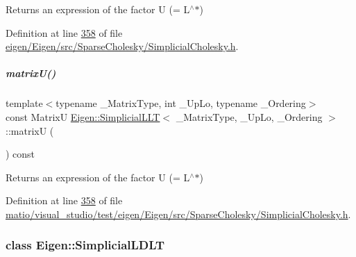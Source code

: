 \begin{DoxyReturn}{Returns}
an expression of the factor U (= L$^\wedge$$\ast$) 
\end{DoxyReturn}


Definition at line \hyperlink{eigen_2_eigen_2src_2_sparse_cholesky_2_simplicial_cholesky_8h_source_l00358}{358} of file \hyperlink{eigen_2_eigen_2src_2_sparse_cholesky_2_simplicial_cholesky_8h_source}{eigen/\+Eigen/src/\+Sparse\+Cholesky/\+Simplicial\+Cholesky.\+h}.

\mbox{\label{group___sparse_cholesky___module_a23522d6444c344ddb14e48dbfac128ed}} 
\subparagraph{\texorpdfstring{matrix\+U()}{matrixU()}\hspace{0.1cm}{\footnotesize\ttfamily [2/2]}}
{\footnotesize\ttfamily template$<$typename \+\_\+\+Matrix\+Type, int \+\_\+\+Up\+Lo, typename \+\_\+\+Ordering$>$ \\
const MatrixU \hyperlink{group___sparse_cholesky___module_class_eigen_1_1_simplicial_l_l_t}{Eigen\+::\+Simplicial\+L\+LT}$<$ \+\_\+\+Matrix\+Type, \+\_\+\+Up\+Lo, \+\_\+\+Ordering $>$\+::matrixU (\begin{DoxyParamCaption}{ }\end{DoxyParamCaption}) const\hspace{0.3cm}{\ttfamily [inline]}}

\begin{DoxyReturn}{Returns}
an expression of the factor U (= L$^\wedge$$\ast$) 
\end{DoxyReturn}


Definition at line \hyperlink{matio_2visual__studio_2test_2eigen_2_eigen_2src_2_sparse_cholesky_2_simplicial_cholesky_8h_source_l00358}{358} of file \hyperlink{matio_2visual__studio_2test_2eigen_2_eigen_2src_2_sparse_cholesky_2_simplicial_cholesky_8h_source}{matio/visual\+\_\+studio/test/eigen/\+Eigen/src/\+Sparse\+Cholesky/\+Simplicial\+Cholesky.\+h}.

\label{class_eigen_1_1_simplicial_l_d_l_t}
\subsubsection{class Eigen\+:\+:Simplicial\+L\+D\+LT}
